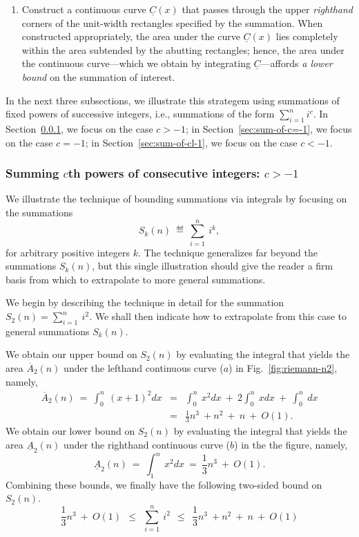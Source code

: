 \begin{enumerate}
\item
Construct a continuous curve $\underline{C}(x)$ that passes through
the upper {\em righthand} corners of the unit-width rectangles
specified by the summation.  When constructed appropriately, the area
under the curve $\underline{C}(x)$ lies completely within the area
subtended by the abutting rectangles; hence, the area under the
continuous curve---which we obtain by integrating
$\underline{C}$---affords {\em a lower bound} on the summation of
interest.
\end{enumerate}

In the next three subsections, we illustrate this strategem using
summations of fixed powers of successive integers, i.e., summations of
the form $\displaystyle \sum_{i=1}^n i^c$.  In
Section~\ref{sec:sum-of-cg-1}, we focus on the case $c > -1$; in
Section~\ref{sec:sum-of-c=-1}, we focus on the case $c = -1$; in
Section~\ref{sec:sum-of-cl-1}, we focus on the case $c < -1$.


\subsubsection{Summing $c$th powers of consecutive integers: $c > -1$}
\label{sec:sum-of-cg-1}

We illustrate the technique of bounding summations via integrals by
focusing on the summations
\[ S_k(n) \ \eqdef \ \sum_{i=1}^n \ i^k, \]
for arbitrary positive integers $k$.  The technique generalizes far
beyond the summations $S_k(n)$, but this single illustration should
give the reader a firm basis from which to extrapolate to more general
summations.



We begin by describing the technique in detail for the summation
$\displaystyle S_2(n) = \sum_{i=1}^n \ i^2$.  We shall then indicate
how to extrapolate from this case to general summations $S_k(n)$.

We obtain our upper bound on $S_2(n)$ by evaluating the integral that
yields the area $\overline{A}_2(n)$ under the lefthand continuous
curve ($a$) in Fig.~\ref{fig:riemann-n2}, namely,
\begin{eqnarray}
\label{eq:upper-integral-x2}
\overline{A}_2(n) \ = \
\int_0^n \ (x+1)^2 dx & = &
  \int_0^n \ x^2 dx \ + \ 2 \int_0^n \ x dx \ + \ \int_0^n \ dx \\
\nonumber
 & = & \frac{1}{3} n^3 \ + n^2 \ + \ n \ + \ O(1).
\end{eqnarray}
We obtain our lower bound on $S_2(n)$ by evaluating the integral that
yields the area $\underline{A}_2(n)$ under the righthand continuous
curve ($b$) in the the figure, namely,
\begin{equation}
\label{eq:lower-integral-x2}
\underline{A}_2(n) \ = \
\int_1^n \ x^2 dx \ = \ \frac{1}{3} n^3 \ + \ O(1).
\end{equation}
Combining these bounds, we finally have the following two-sided bound
on $S_2(n)$.
\begin{equation}
\label{eq:bounds-sum-x2}
\frac{1}{3} n^3 \ + \ O(1)
  \ \ \leq \ \ \sum_{i=1}^n \ i^2
  \ \ \leq \ \ \frac{1}{3} n^3 \ + n^2 \ + \ n \ + \ O(1)
\end{equation}

